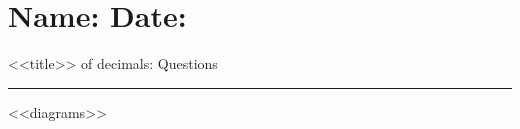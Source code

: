 \documentclass[leqno, 12pt]{article}
\def \HeadingQuestions {\section*{\Large Name: \underline{\hspace{8cm}} \hfill Date: \underline{\hspace{3cm}}} \vspace{-3mm}
{<<title>> of decimals: Questions} \vspace{1pt}\hrule}
\begin{document}
\HeadingQuestions
\vspace{-5mm}
\begin{multicols}{3}
<<diagrams>>
\end{multicols}
\end{document}
